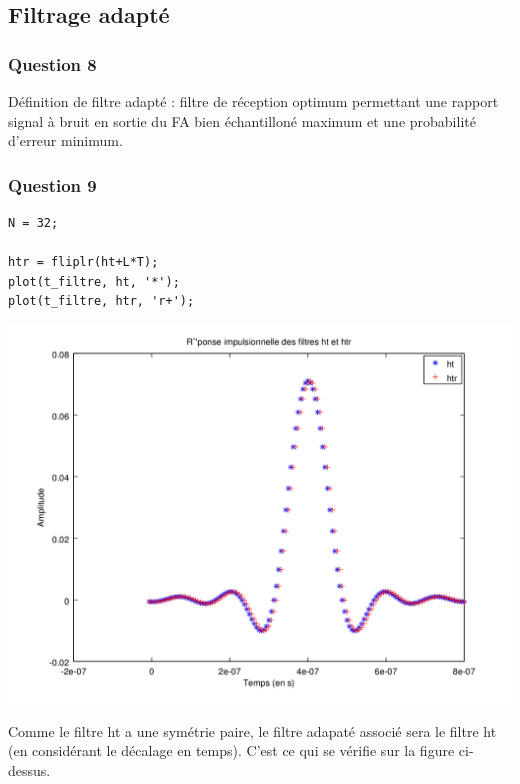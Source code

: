 \documentclass{acm_proc_article-sp}
\begin{document}
\subsection{Filtrage adapté}
\subsubsection{Question 8}
Définition de filtre adapté : filtre de réception optimum permettant une rapport signal à bruit en sortie du FA bien échantilloné maximum et une probabilité d'erreur minimum.\\

\subsubsection{Question 9}

\begin{center}
\begin{lstlisting}
N = 32;

htr = fliplr(ht+L*T);
plot(t_filtre, ht, '*');
plot(t_filtre, htr, 'r+');
\end{lstlisting}

\includegraphics[scale=0.45]{ht_htr_9.png}
\end{center}

Comme le filtre ht a une symétrie paire, le filtre adapaté associé sera le filtre ht (en considérant le décalage en temps). C'est ce qui se vérifie sur la figure ci-dessus.
\end{document}
